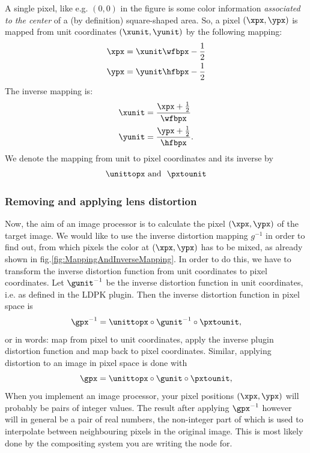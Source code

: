 \documentclass[10pt,a4paper]{article}
\begin{document}
A single pixel, like e.g. $(0,0)$ in the figure is some color information
{\em associated to the center} of a (by definition) square-shaped area.
So, a pixel $(\xpx,\ypx)$ is mapped from unit coordinates $(\xunit,\yunit)$
by the following mapping:
\begin{align}
\label{eq:DefinitionUnitToPx}
\xpx &= \xunit \wfbpx - \frac 1 2\nonumber\\
\ypx &= \yunit \hfbpx - \frac 1 2
\end{align}
The inverse mapping is:
\begin{align}
\label{eq:DefinitionPxToUnit}
\xunit &= \frac {\xpx + \frac 1 2} {\wfbpx}\nonumber\\
\yunit &= \frac {\ypx + \frac 1 2} {\hfbpx}.
\end{align}
We denote the mapping from unit to pixel coordinates and its inverse by
\begin{equation}
\unittopx \text{\ and \ } \pxtounit
\end{equation}

\subsubsection{Removing and applying lens distortion}
Now, the aim of an image processor is to calculate the pixel $(\xpx,\ypx)$ of the target image.
We would like to use the inverse distortion mapping $g^{-1}$ in order
to find out, from which pixels the color at $(\xpx,\ypx)$ has to be
mixed, as already shown in fig.\ref{fig:MappingAndInverseMapping}.
In order to do this, we have to transform the inverse distortion function
from unit coordinates to pixel coordinates. Let $\gunit^{-1}$ be the inverse
distortion function in unit coordinates, i.e. as defined in the LDPK plugin.
Then the inverse distortion function in pixel space is
\begin{equation}
\gpx^{-1} = \unittopx \circ \gunit^{-1} \circ \pxtounit,
\end{equation}
or in words: map from pixel to unit coordinates, apply the inverse plugin distortion function
and map back to pixel coordinates. Similar, applying distortion to an image in pixel space is done with
\begin{equation}
\gpx = \unittopx \circ \gunit \circ \pxtounit,
\end{equation}
When you implement an image processor, your pixel positions $(\xpx,\ypx)$ will probably be pairs of
integer values. The result after applying $\gpx^{-1}$ however will in general be a pair of real numbers,
the non-integer part of which is used to interpolate between neighbouring pixels in the original image.
This is most likely done by the compositing system you are writing the node for.
\end{document}
